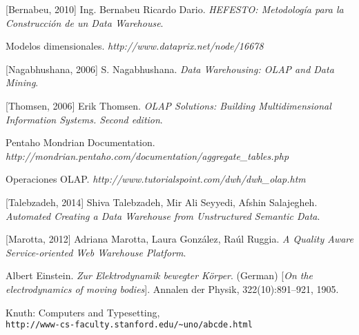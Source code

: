 \documentclass[a4paper,11pt]{article}
\begin{document}
  \begin{thebibliography}{9}
    
    [Bernabeu, 2010] Ing. Bernabeu Ricardo Dario.
    \textit{HEFESTO: Metodología para la Construcción de un Data Warehouse}.
    
    Modelos dimensionales.
    \textit{http://www.dataprix.net/node/16678}
    
    [Nagabhushana, 2006] S. Nagabhushana.
    \textit{Data Warehousing: OLAP and Data Mining}.
    
    [Thomsen, 2006] Erik Thomsen.
    \textit{OLAP Solutions: Building Multidimensional Information Systems. Second edition}.
    
    Pentaho Mondrian Documentation.
    \textit{http://mondrian.pentaho.com/documentation/aggregate\_tables.php}
    
    Operaciones OLAP.
    \textit{http://www.tutorialspoint.com/dwh/dwh\_olap.htm}
    
    [Talebzadeh, 2014] Shiva Talebzadeh, Mir Ali Seyyedi, Afshin Salajegheh.
    \textit{Automated Creating a Data Warehouse from Unstructured Semantic Data}.
    
    [Marotta, 2012] Adriana Marotta, Laura González, Raúl Ruggia.
    \textit{A Quality Aware Service-oriented Web Warehouse Platform}.
    
    Albert Einstein. 
    \textit{Zur Elektrodynamik bewegter K{\"o}rper}. (German) 
    [\textit{On the electrodynamics of moving bodies}]. 
    Annalen der Physik, 322(10):891–921, 1905. 
    
     
    Knuth: Computers and Typesetting,
    \\\texttt{http://www-cs-faculty.stanford.edu/\~{}uno/abcde.html}
  \end{thebibliography}
  
  
  
  \printindex
  
\end{document}
